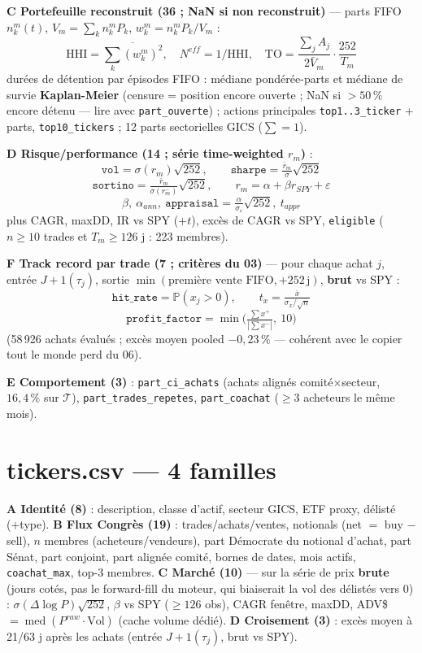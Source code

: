 \documentclass[10pt,a4paper,twocolumn]{article}
\begin{document}
\textbf{C Portefeuille reconstruit (36 ; NaN si non reconstruit)} --- parts FIFO
$n_k^m(t)$, $V_m = \sum_k n_k^m P_k$, $w_k^m = n_k^m P_k / V_m$ :
$$\mathrm{HHI} = \overline{\textstyle\sum_k (w_k^m)^2}, \quad N^{e\!f\!f} = 1/\mathrm{HHI}, \quad
\mathrm{TO} = \frac{\sum_j A_j}{2 \bar V_m}\cdot\frac{252}{T_m}$$
durées de détention par épisodes FIFO : médiane pondérée-parts et médiane de survie
\textbf{Kaplan-Meier} (censure = position encore ouverte ; NaN si $>50\,\%$ encore détenu ---
lire avec \texttt{part\_ouverte}) ; actions principales \texttt{top1..3\_ticker} + parts,
\texttt{top10\_tickers} ; 12 parts sectorielles GICS ($\sum = 1$).

\textbf{D Risque/performance (14 ; série time-weighted $r_m$)} :
$$\texttt{vol} = \sigma(r_m)\sqrt{252}, \qquad \texttt{sharpe} = \tfrac{\bar r_m}{\sigma}\sqrt{252}$$
$$\texttt{sortino} = \tfrac{\bar r_m}{\sigma(r_m^-)}\sqrt{252}, \qquad
r_m = \alpha + \beta r_{SPY} + \varepsilon$$
$$\beta,\ \alpha_{ann},\ \texttt{appraisal} = \tfrac{\alpha}{\sigma_\varepsilon}\sqrt{252},\ t_{appr}$$
plus CAGR, maxDD, IR vs SPY ($+t$), excès de CAGR vs SPY, \texttt{eligible}
($n \ge 10$ trades et $T_m \ge 126$ j : 223 membres).

\textbf{F Track record par trade (7 ; critères du 03)} --- pour chaque achat $j$, entrée
$J{+}1(\tau_j)$, sortie $\min(\text{première vente FIFO}, +252\,\text{j})$, \textbf{brut} vs SPY :
$$\texttt{hit\_rate} = \mathbb{P}(x_j > 0), \qquad t_x = \tfrac{\bar x}{\sigma_x/\sqrt{n}}$$
$$\texttt{profit\_factor} = \min\!\Big(\tfrac{\sum x^+}{|\sum x^-|},\ 10\Big)$$
(58\,926 achats évalués ; excès moyen pooled $-0{,}23\,\%$ --- cohérent avec le
\og copier tout le monde perd\fg{} du 06).

\textbf{E Comportement (3)} : \texttt{part\_ci\_achats} (achats alignés comité$\times$secteur,
$16{,}4\,\%$ sur $\mathcal{T}$), \texttt{part\_trades\_repetes}, \texttt{part\_coachat}
($\ge 3$ acheteurs le même mois).

\section{tickers.csv --- 4 familles}
\textbf{A Identité (8)} : description, classe d'actif, secteur GICS, ETF proxy, délisté (+type).
\textbf{B Flux Congrès (19)} : trades/achats/ventes, notionals (net $=$ buy $-$ sell),
$n$ membres (acheteurs/vendeurs), part Démocrate du notional d'achat, part Sénat, part conjoint,
part alignée comité, bornes de dates, mois actifs, \texttt{coachat\_max}, top-3 membres.
\textbf{C Marché (10)} --- sur la série de prix \textbf{brute} (jours cotés, pas le forward-fill du
moteur, qui biaiserait la vol des délistés vers 0) : $\sigma(\Delta\log P)\sqrt{252}$,
$\beta$ vs SPY ($\ge 126$ obs), CAGR fenêtre, maxDD, ADV\$ $= \operatorname{med}(P^{raw}\cdot\mathrm{Vol})$
(cache volume dédié).
\textbf{D Croisement (3)} : excès moyen à 21/63 j après les achats (entrée $J{+}1(\tau_j)$, brut vs SPY).
\end{document}
